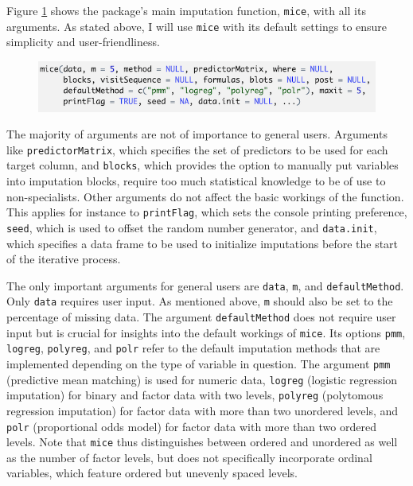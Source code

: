 \documentclass[12pt,econ]{sources/authesis}
\makeatletter
\def\maxwidth{\ifdim\Gin@nat@width>\linewidth\linewidth
\else\Gin@nat@width\fi}
\let\Oldincludegraphics\includegraphics
\renewcommand{\includegraphics}[1]{\Oldincludegraphics[width=\maxwidth]{#1}}
\def\caption{\refstepcounter\@captype \@dblarg{\@caption\@captype}}
\makeatother
\begin{document}
Figure \ref{mice-func} shows the package's main imputation function, \texttt{mice}, with all its arguments. As stated above, I will use \texttt{mice} with its default settings to ensure simplicity and user-friendliness.
\begin{figure}[hbt]
  \centering
  \includegraphics{figures/mice.png}
  \caption{The \texttt{mice} function}
  \label{mice-func}
\end{figure}
The majority of arguments are not of importance to general users. Arguments like \texttt{predictorMatrix}, which specifies the set of predictors to be used for each target column, and \texttt{blocks}, which provides the option to manually put variables into imputation blocks, require too much statistical knowledge to be of use to non-specialists. Other arguments do not affect the basic workings of the function. This applies for instance to \texttt{printFlag}, which sets the console printing preference, \texttt{seed}, which is used to offset the random number generator, and \texttt{data.init}, which specifies a data frame to be used to initialize imputations before the start of the iterative process.

The only important arguments for general users are \texttt{data}, \texttt{m}, and \texttt{defaultMethod}. Only \texttt{data} requires user input. As mentioned above, \texttt{m} should also be set to the percentage of missing data. The argument \texttt{defaultMethod} does not require user input but is crucial for insights into the default workings of \texttt{mice}. Its options \texttt{pmm}, \texttt{logreg}, \texttt{polyreg}, and \texttt{polr} refer to the default imputation methods that are implemented depending on the type of variable in question. The argument \texttt{pmm} (predictive mean matching) is used for numeric data, \texttt{logreg} (logistic regression imputation) for binary and factor data with two levels, \texttt{polyreg} (polytomous regression imputation) for factor data with more than two unordered levels, and \texttt{polr} (proportional odds model) for factor data with more than two ordered levels. Note that \texttt{mice} thus distinguishes between ordered and unordered as well as the number of factor levels, but does not specifically incorporate ordinal variables, which feature ordered but unevenly spaced levels.
\end{document}
